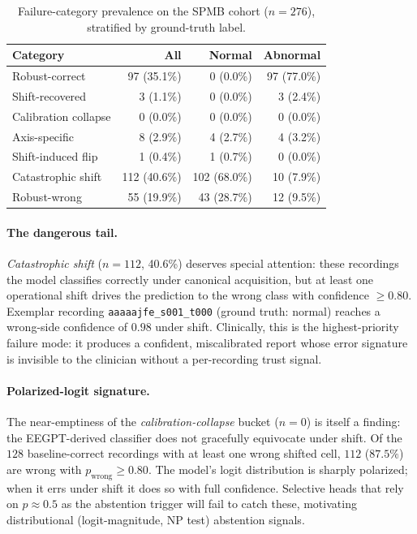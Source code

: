 \begin{table}[t]
\centering
\caption{Failure-category prevalence on the SPMB cohort ($n{=}276$), stratified by ground-truth label.}
\label{tab:failure-counts}
\footnotesize
\begin{tabular}{lrrr}
\toprule
Category & All & Normal & Abnormal \\
\midrule
Robust-correct & 97 (35.1\%) & 0 (0.0\%) & 97 (77.0\%) \\
Shift-recovered & 3 (1.1\%) & 0 (0.0\%) & 3 (2.4\%) \\
Calibration collapse & 0 (0.0\%) & 0 (0.0\%) & 0 (0.0\%) \\
Axis-specific & 8 (2.9\%) & 4 (2.7\%) & 4 (3.2\%) \\
Shift-induced flip & 1 (0.4\%) & 1 (0.7\%) & 0 (0.0\%) \\
Catastrophic shift & 112 (40.6\%) & 102 (68.0\%) & 10 (7.9\%) \\
Robust-wrong & 55 (19.9\%) & 43 (28.7\%) & 12 (9.5\%) \\
\bottomrule
\end{tabular}
\end{table}

\paragraph{The dangerous tail.} \emph{Catastrophic shift} ($n{=}112$, 40.6\%) deserves special attention: these recordings the model classifies correctly under canonical acquisition, but at least one operational shift drives the prediction to the wrong class with confidence $\geq 0.80$. Exemplar recording \texttt{aaaaajfe\_s001\_t000} (ground truth: normal) reaches a wrong-side confidence of $0.98$ under shift. Clinically, this is the highest-priority failure mode: it produces a confident, miscalibrated report whose error signature is invisible to the clinician without a per-recording trust signal.

\paragraph{Polarized-logit signature.} The near-emptiness of the \emph{calibration-collapse} bucket ($n{=}0$) is itself a finding: the EEGPT-derived classifier does not gracefully equivocate under shift. Of the $128$ baseline-correct recordings with at least one wrong shifted cell, $112$ ($87.5\%$) are wrong with $p_{\text{wrong}}\!\geq\!0.80$. The model's logit distribution is sharply polarized; when it errs under shift it does so with full confidence. Selective heads that rely on $p\!\approx\!0.5$ as the abstention trigger will fail to catch these, motivating distributional (logit-magnitude, NP test) abstention signals.

